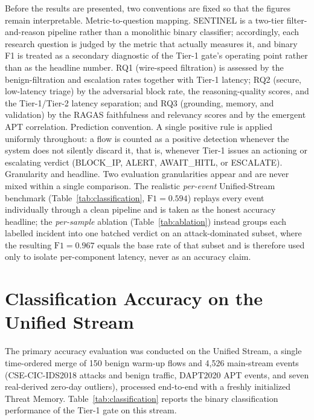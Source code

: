 Before the results are presented, two conventions are fixed so that the figures remain interpretable. Metric-to-question mapping. SENTINEL is a two-tier filter-and-reason pipeline rather than a monolithic binary classifier; accordingly, each research question is judged by the metric that actually measures it, and binary F1 is treated as a secondary diagnostic of the Tier-1 gate's operating point rather than as the headline number. RQ1 (wire-speed filtration) is assessed by the benign-filtration and escalation rates together with Tier-1 latency; RQ2 (secure, low-latency triage) by the adversarial block rate, the reasoning-quality scores, and the Tier-1/Tier-2 latency separation; and RQ3 (grounding, memory, and validation) by the RAGAS faithfulness and relevancy scores and by the emergent APT correlation. Prediction convention. A single positive rule is applied uniformly throughout: a flow is counted as a positive detection whenever the system does not silently discard it, that is, whenever Tier-1 issues an actioning or escalating verdict (BLOCK\_IP, ALERT, AWAIT\_HITL, or ESCALATE). Granularity and headline. Two evaluation granularities appear and are never mixed within a single comparison. The realistic \emph{per-event} Unified-Stream benchmark (Table~\ref{tab:classification}, $\mathrm{F1}=0.594$) replays every event individually through a clean pipeline and is taken as the honest accuracy headline; the \emph{per-sample} ablation (Table~\ref{tab:ablation}) instead groups each labelled incident into one batched verdict on an attack-dominated subset, where the resulting $\mathrm{F1}=0.967$ equals the base rate of that subset and is therefore used only to isolate per-component latency, never as an accuracy claim.

\section{Classification Accuracy on the Unified Stream}
The primary accuracy evaluation was conducted on the Unified Stream, a single time-ordered merge of 150 benign warm-up flows and 4{,}526 main-stream events (CSE-CIC-IDS2018 attacks and benign traffic, DAPT2020 APT events, and seven real-derived zero-day outliers), processed end-to-end with a freshly initialized Threat Memory. Table~\ref{tab:classification} reports the binary classification performance of the Tier-1 gate on this stream.

